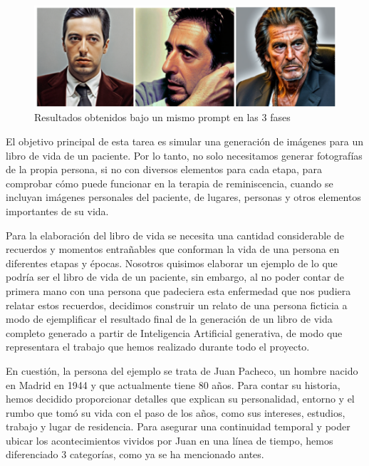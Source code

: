 \begin{figure}[!htb]
	\centering
	\includegraphics[width = 1
	\textwidth]{Imagenes/Vectorial/3fasesvidaalp.png}
	\caption{Resultados obtenidos bajo un mismo prompt en las 3 fases}
	\label{fig:3fasesvidaalp}
\end{figure}


El objetivo principal de esta tarea es simular una generación de imágenes para un libro de vida de un paciente. Por lo tanto, no solo necesitamos generar fotografías de la propia persona, si no con diversos elementos para cada etapa, para comprobar cómo puede funcionar en la terapia de reminiscencia, cuando se incluyan imágenes personales del paciente, de lugares, personas y otros elementos importantes de su vida.

Para la elaboración del libro de vida se necesita una cantidad considerable de recuerdos y momentos entrañables que conforman la vida de una persona en diferentes etapas y épocas. Nosotros quisimos elaborar un ejemplo de lo que podría ser el libro de vida de un paciente, sin embargo, al no poder contar de primera mano con una persona que padeciera esta enfermedad que nos pudiera relatar estos recuerdos, decidimos construir un relato de una persona ficticia a modo de ejemplificar el resultado final de la generación de un libro de vida completo generado a partir de Inteligencia Artificial generativa, de modo que representara el trabajo que hemos realizado durante todo el proyecto. 

En cuestión, la persona del ejemplo se trata de Juan Pacheco, un hombre nacido en Madrid en 1944 y que actualmente tiene 80 años. Para contar su historia, hemos decidido proporcionar detalles que explican su personalidad, entorno y el rumbo que tomó su vida con el paso de los años, como sus intereses, estudios, trabajo y lugar de residencia. Para asegurar una continuidad temporal y poder ubicar los acontecimientos vividos por Juan en una línea de tiempo, hemos diferenciado 3 categorías, como ya se ha mencionado antes. 



